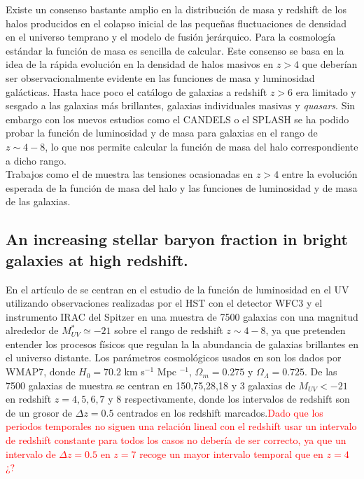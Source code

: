 \documentclass{article}
\begin{document}
Existe un consenso bastante amplio en la distribución de masa y redshift de los halos producidos en el colapso inicial de las pequeñas fluctuaciones de densidad en el universo temprano y el modelo de fusión jerárquico. Para la cosmología estándar la función de masa es sencilla de calcular. Este consenso se basa en la idea de la rápida evolución en la densidad de halos masivos en $z>4$ que deberían ser observacionalmente evidente en las funciones de masa y luminosidad galácticas. Hasta hace poco el catálogo de galaxias a redshift $z>6$ era limitado y sesgado a las galaxias más brillantes, galaxias individuales masivas y \textit{quasars}. Sin embargo con los nuevos estudios como el CANDELS o el SPLASH se ha podido probar la función de luminosidad y de masa para galaxias en el rango de $z\sim 4-8$, lo que nos permite calcular la función de masa del halo correspondiente a dicho rango.\\

Trabajos como el de \cite{finkelstein2015increasing} muestra las tensiones ocasionadas en $z>4$ entre la evolución esperada de la función de masa del halo y las funciones de luminosidad y de masa de las galaxias. \\

\subsection*{An increasing stellar baryon fraction in bright galaxies at high redshift.}
En el artículo de \cite{finkelstein2015increasing} se centran en el estudio de la función de luminosidad en el UV utilizando observaciones realizadas por el HST con el detector WFC3 y el instrumento IRAC del Spitzer en una muestra de 7500 galaxias con una magnitud alrededor de $M_{UV}^*\simeq -21$ sobre el rango de redshift $z\sim 4-8$, ya que pretenden entender los procesos físicos que regulan la la abundancia de galaxias brillantes en el universo distante. Los parámetros cosmológicos usados en \cite{finkelstein2015increasing} son los dados por WMAP7, donde $H_0=70.2$ km s$^{-1}$ Mpc $^{-1}$, $\Omega_m=0.275$ y $\Omega_\Lambda=0.725$. De las 7500 galaxias de muestra se centran en 150,75,28,18 y 3 galaxias de $M_{UV}<-21$ en redshift $z=4,5,6,7$ y 8 respectivamente, donde los intervalos de redshift son de un grosor de $\Delta z=0.5$ centrados en los redshift marcados.\textcolor{red}{Dado que los periodos temporales no siguen una relación lineal con el redshift usar un intervalo de redshift constante para todos los casos no debería de ser correcto, ya que un intervalo de $\Delta z=0.5$ en $z=7$ recoge un mayor intervalo temporal que en $z=4$ ¿?}\\
\end{document}
